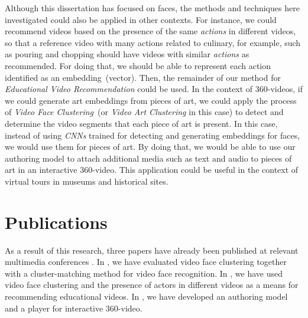 Although this dissertation has focused on faces, the methods and techniques here investigated could also be applied in other contexts. For instance, we could recommend videos based on the presence of the same \emph{actions} in different videos, so that a reference video with many actions related to culinary, for example, such as pouring and chopping should have videos with similar \emph{actions} as recommended. For doing that, we should be able to represent each action identified as an embedding~(vector). Then, the remainder of our method for \emph{Educational Video Recommendation} could be used. In the context of 360-videos, if we could generate art embeddings from pieces of art, we could apply the process of \emph{Video Face Clustering}~(or \emph{Video Art Clustering} in this case) to detect and determine the video segments that each piece of art is present. In this case, instead of using \emph{CNNs} trained for detecting and generating embeddings for faces, we would use them for pieces of art. By doing that, we would be able to use our authoring model to attach additional media such as text and audio to pieces of art in an interactive 360-video. This application could be useful in the context of virtual tours in museums and historical sites.


\section{Publications}

 As a result of this research, three papers have already been published at relevant multimedia conferences \cite{mendes2020cluster,mendes2020ISM, mendes2020authoring}. In \cite{mendes2020cluster}, we have evaluated video face clustering together with a cluster-matching method for video face recognition. In \cite{mendes2020ISM}, we have used video face clustering and the presence of actors in different videos as a means for recommending educational videos. In \cite{mendes2020authoring}, we have developed an authoring model and a player for interactive 360-video. 
